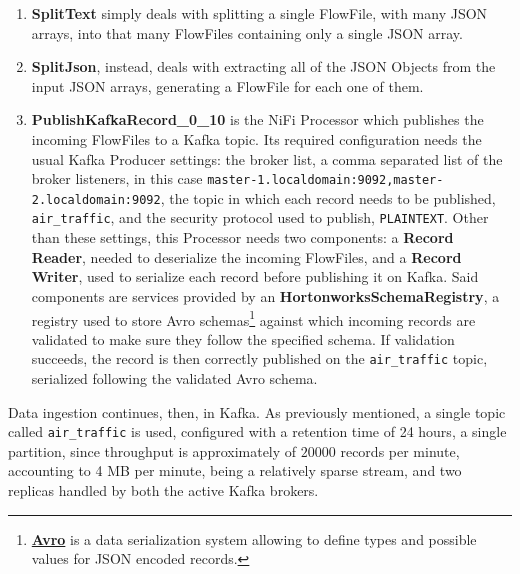 \begin{enumerate}
\item \textbf{SplitText} simply deals with splitting a single FlowFile, with many JSON arrays, into that many FlowFiles containing only a single JSON array.
\item \textbf{SplitJson}, instead, deals with extracting all of the JSON Objects from the input JSON arrays, generating a FlowFile for each one of them.
\item \textbf{PublishKafkaRecord\_0\_10} is the NiFi Processor which publishes the incoming FlowFiles to a Kafka topic. Its required configuration needs the usual Kafka Producer settings: the broker list, a comma separated list of the broker listeners, in this case \texttt{master-1.localdomain:9092,master-2.localdomain:9092}, the topic in which each record needs to be published, \texttt{air\_traffic}, and the security protocol used to publish, \texttt{PLAINTEXT}. Other than these settings, this Processor needs two components: a \textbf{Record Reader}, needed to deserialize the incoming FlowFiles, and a \textbf{Record Writer}, used to serialize each record before publishing it on Kafka. Said components are services provided by an \textbf{HortonworksSchemaRegistry}, a registry used to store Avro schemas\footnote{\textbf{\href{https://avro.apache.org/}{Avro}} is a data serialization system allowing to define types and possible values for JSON encoded records.} against which incoming records are validated to make sure they follow the specified schema. If validation succeeds, the record is then correctly published on the \texttt{air\_traffic} topic, serialized following the validated Avro schema.
\end{enumerate}

Data ingestion continues, then, in Kafka. As previously mentioned, a single topic called \texttt{air\_traffic} is used, configured with a retention time of 24 hours, a single partition, since throughput is approximately of $20000$ records per minute, accounting to 4 MB per minute, being a relatively sparse stream, and two replicas handled by both the active Kafka brokers.
\pagebreak